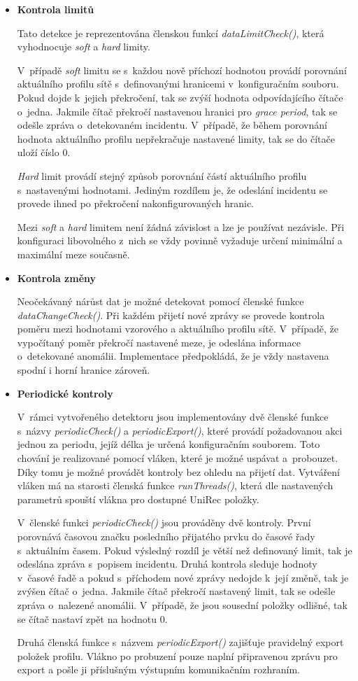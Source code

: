 \begin{itemize}
 \item \textbf{Kontrola limitů}
 
 Tato detekce je reprezentována členskou funkcí \textit{dataLimitCheck()}, která vyhodnocuje
 \textit{soft} a \textit{hard} limity. 
 
 V~případě \textit{soft} limitu se s~každou nově příchozí hodnotou provádí
 porovnání aktuálního profilu sítě s~definovanými hranicemi v~konfiguračním souboru. Pokud dojde
 k~jejich překročení, tak se zvýší hodnota odpovídajícího čítače o~jedna. Jakmile čítač překročí nastavenou 
 hranici pro \textit{grace period}, tak se odešle zpráva o~detekovaném incidentu. V~případě, že 
 během porovnání hodnota aktuálního profilu nepřekračuje nastavené limity, tak se do čítače uloží 
 číslo 0.
 
 \textit{Hard} limit provádí stejný způsob porovnání částí aktuálního profilu s~nastavenými hodnotami. Jediným
 rozdílem je, že odeslání incidentu se provede ihned po překročení nakonfigurovaných hranic.
 
 Mezi \textit{soft} a \textit{hard} limitem není žádná závislost a lze je používat nezávisle. Při konfiguraci 
 libovolného z~nich se vždy povinně vyžaduje určení minimální a maximální meze současně.
 
 \item \textbf{Kontrola změny}
 
 Neočekávaný nárůst dat je možné detekovat pomocí členské funkce \textit{dataChangeCheck()}.
 Při každém přijetí nové zprávy se provede kontrola poměru mezi hodnotami vzorového a aktuálního
 profilu sítě. V~případě, že vypočítaný poměr překročí nastavené meze, je odeslána informace 
 o~detekované anomálii. Implementace předpokládá, že je vždy nastavena spodní i horní hranice
 zároveň.
 
 \item \textbf{Periodické kontroly}
 
 V~rámci vytvořeného detektoru jsou implementovány dvě členské funkce s~názvy
 \textit{periodicCheck()} a \textit{periodicExport()}, které provádí požadovanou akci jednou
 za periodu, jejíž délka je určená konfiguračním souborem. Toto chování je realizované pomocí 
 vláken, které je možné uspávat a~probouzet. Díky tomu je možné provádět kontroly bez ohledu
 na přijetí dat. Vytváření vláken má na starosti členská funkce
 \textit{runThreads()}, která dle nastavených parametrů spouští vlákna pro dostupné UniRec položky.
 
 V~členské funkci \textit{periodicCheck()} jsou prováděny dvě kontroly. První porovnává
 časovou značku posledního přijatého prvku do časové řady s~aktuálním časem. Pokud výsledný rozdíl je větší
 než definovaný limit, tak je odeslána zpráva s~popisem incidentu. Druhá kontrola sleduje hodnoty
 v~časové řadě a pokud s~příchodem nové zprávy nedojde k~její změně, tak je zvýšen čítač o~jedna. 
 Jakmile čítač překročí nastavený limit, tak se odešle zpráva o~nalezené anomálii. V~případě,
 že jsou sousední položky odlišné, tak se čítač nastaví zpět na hodnotu 0.
 
 Druhá členská funkce s~názvem \textit{periodicExport()} zajišťuje pravidelný export položek profilu.
 Vlákno po probuzení pouze naplní připravenou zprávu pro export a pošle ji příslušným výstupním
 komunikačním rozhraním.
 
\end{itemize}
